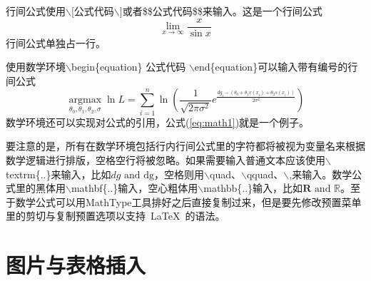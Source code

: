 行间公式使用$\backslash$[\textcolor[rgb]{0,0,1}{公式代码}$\backslash$]或者\$\$\textcolor[rgb]{0,0,1}{公式代码}\$\$来输入。这是一个行间公式$$\mathop {\lim }\limits_{x \to \infty } \frac{x}{{\sin x}}$$行间公式单独占一行。


使用数学环境$\backslash$begin\{equation\} \textcolor[rgb]{0,0,1}{公式代码} $\backslash$end\{equation\}可以输入带有编号的行间公式
\begin{equation} \label{eq:math1}
\mathop {\arg \max }\limits_{{\theta _0},{\theta _1},{\theta _2},\sigma } \ln L = \sum\limits_{i = 1}^n {\ln (\frac{1}{{\sqrt {2\pi {\sigma ^2}} }}{e^{\frac{{d{g_i} - ({\theta _0} + {\theta _1}v({x_i}) + {\theta _2}s({x_i}))}}{{2{\sigma ^2}}}}})} 
\end{equation}
数学环境还可以实现对公式的引用，公式(\ref{eq:math1})就是一个例子。


要注意的是，所有在数学环境包括行内行间公式里的字符都将被视为变量名来根据数学逻辑进行排版，空格空行将被忽略。如果需要输入普通文本应该使用$\backslash$textrm\{..\}来输入，比如$dg\textrm{ and dg}$，空格则用$\backslash$quad、$\backslash$qquad、$\backslash$,来输入。数学公式里的黑体用$\backslash$mathbf\{..\}输入，空心粗体用$\backslash$mathbb\{..\}输入，比如$\mathbf{R}\textrm{ and }\mathbb{R}$。至于数学公式可以用MathType工具排好之后直接复制过来，但是要先修改预置菜单里的剪切与复制预置选项以支持~\LaTeX{}~的语法。


\section{图片与表格插入}
